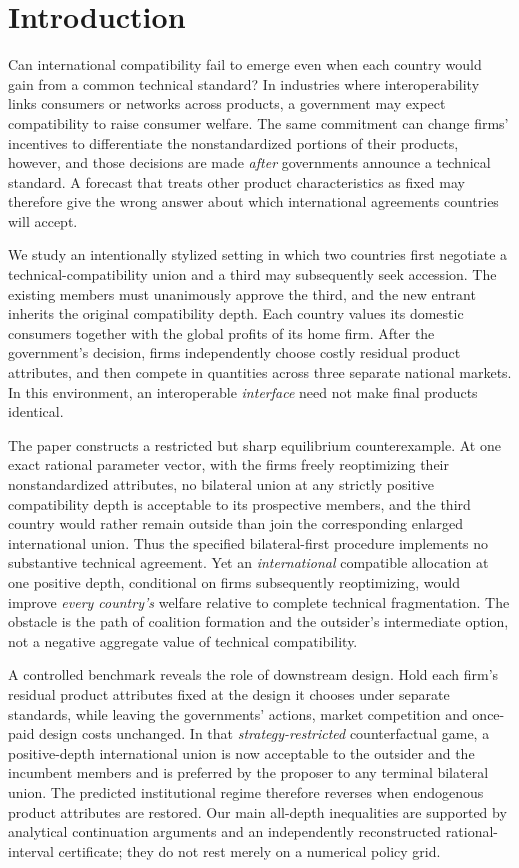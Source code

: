 \section{Introduction}\label{sec:introduction}

Can international compatibility fail to emerge even when
each country would gain from a common technical standard?
In industries where interoperability links consumers or
networks across products, a government may expect
compatibility to raise consumer welfare. The same
commitment can change firms' incentives to differentiate
the nonstandardized portions of their products, however,
and those decisions are made \emph{after} governments
announce a technical standard. A forecast that treats
other product characteristics as fixed may therefore
give the wrong answer about which international
agreements countries will accept.

We study an intentionally stylized setting in which
two countries first negotiate a technical-compatibility
union and a third may subsequently seek accession.
The existing members must unanimously approve the
third, and the new entrant inherits the original
compatibility depth. Each country values its domestic
consumers together with the global profits of its
home firm. After the government's decision, firms
independently choose costly residual product attributes,
and then compete in quantities across three separate
national markets. In this environment, an interoperable
\emph{interface} need not make final products identical.

The paper constructs a restricted but sharp
equilibrium counterexample. At one exact rational
parameter vector, with the firms freely reoptimizing
their nonstandardized attributes, no bilateral union
at any strictly positive compatibility depth is
acceptable to its prospective members, and the
third country would rather remain outside than join
the corresponding enlarged international union.
Thus the specified bilateral-first procedure implements
no substantive technical agreement. Yet an
\emph{international} compatible allocation at one
positive depth, conditional on firms subsequently
reoptimizing, would improve \emph{every country's}
welfare relative to complete technical fragmentation.
The obstacle is the path of coalition formation and
the outsider's intermediate option, not a negative
aggregate value of technical compatibility.

A controlled benchmark reveals the role of downstream
design. Hold each firm's residual product attributes
fixed at the design it chooses under separate
standards, while leaving the governments' actions,
market competition and once-paid design costs
unchanged. In that \emph{strategy-restricted}
counterfactual game, a positive-depth international
union is now acceptable to the outsider and the
incumbent members and is preferred by the proposer
to any terminal bilateral union. The predicted
institutional regime therefore reverses when
endogenous product attributes are restored.
Our main all-depth inequalities are supported by
analytical continuation arguments and an independently
reconstructed rational-interval certificate; they
do not rest merely on a numerical policy grid.

